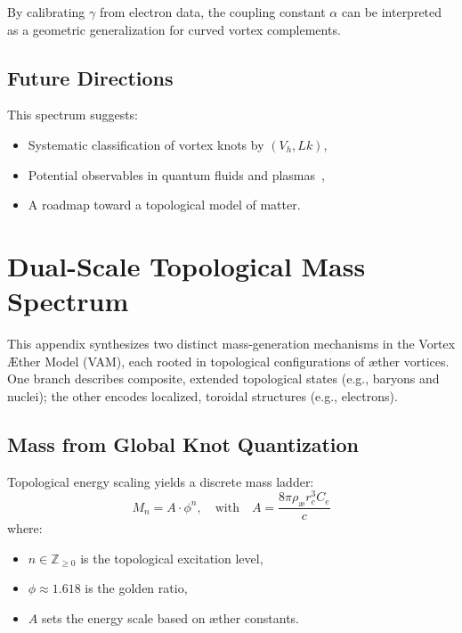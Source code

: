 \documentclass[a4paper,12pt]{article}
\begin{document}
        By calibrating $\gamma$ from electron data, the coupling constant $\alpha$ can be interpreted as a geometric generalization for curved vortex complements.

        \subsection{Future Directions}

        This spectrum suggests:
        \begin{itemize}
            \item Systematic classification of vortex knots by $(V_h, Lk)$,
            \item Potential observables in quantum fluids and plasmas~\cite{arnold1998topological},
            \item A roadmap toward a topological model of matter.
        \end{itemize}



\section{Dual-Scale Topological Mass Spectrum}
        This appendix synthesizes two distinct mass-generation mechanisms in the Vortex Æther Model (VAM), each rooted in topological configurations of æther vortices. One branch describes composite, extended topological states (e.g., baryons and nuclei); the other encodes localized, toroidal structures (e.g., electrons).

        \subsection{Mass from Global Knot Quantization}

        Topological energy scaling yields a discrete mass ladder:
        \begin{equation}
        M_n = A \cdot \phi^n, \quad \text{with} \quad
        A = \frac{8\pi \rho_{\text{æ}} r_c^3 C_e}{c}
        \end{equation}
        where:
        \begin{itemize}
          \item $n \in \mathbb{Z}_{\geq 0}$ is the topological excitation level,
          \item $\phi \approx 1.618$ is the golden ratio,
          \item $A$ sets the energy scale based on æther constants.
        \end{itemize}
\end{document}

